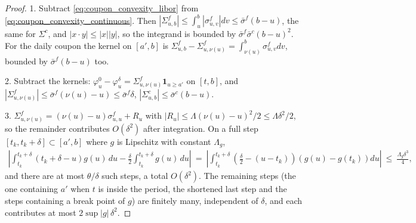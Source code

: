 \documentclass[11pt,english]{amsart}
\newcommand{\vun}{\mathbf{1}}
\theoremstyle{definition}
\begin{document}
\begin{proof}
1. Subtract \eqref{eq:coupon_convexity_libor} from \eqref{eq:coupon_convexity_continuous}. Then $|\Sigma^f_{u,b}|\le\int_u^b|\sigma^f_{u,v}|dv\le\bar{\sigma}^f(b-u)$, the same for $\Sigma^c$, and $|x\cdot y|\le|x||y|$, so the integrand is bounded by $\bar{\sigma}^f\bar{\sigma}^c(b-u)^2$. For the daily coupon the kernel on $[a',b]$ is $\Sigma^f_{u,b}-\Sigma^f_{u,\nu(u)} = \int_{\nu(u)}^b\sigma^f_{u,v}dv$, bounded by $\bar{\sigma}^f(b-u)$ too.

2. Subtract the kernels: $\varphi^0_u-\varphi^\delta_u = \Sigma^f_{u,\nu(u)}\vun_{u\ge a'}$ on $[t,b]$, and $|\Sigma^f_{u,\nu(u)}|\le\bar{\sigma}^f(\nu(u)-u)\le\bar{\sigma}^f\delta$, $|\Sigma^c_{u,b}|\le\bar{\sigma}^c(b-u)$.

3. $\Sigma^f_{u,\nu(u)} = (\nu(u)-u)\sigma^f_{u,u} + R_u$ with $|R_u|\le\Lambda(\nu(u)-u)^2/2\le\Lambda\delta^2/2$, so the remainder contributes $O(\delta^2)$ after integration. On a full step $[t_k,t_k+\delta]\subset[a',b]$ where $g$ is Lipschitz with constant $\Lambda_g$,
\begin{eqnarray*}
  \left|\int_{t_k}^{t_k+\delta}(t_k+\delta-u)g(u)\,du - \frac{\delta}{2}\int_{t_k}^{t_k+\delta}g(u)\,du\right|
  ~=~ \left|\int_{t_k}^{t_k+\delta}\left(\tfrac{\delta}{2}-(u-t_k)\right)\left(g(u)-g(t_k)\right)du\right| ~\le~ \frac{\Lambda_g\delta^3}{4} ,
\end{eqnarray*}
and there are at most $\theta/\delta$ such steps, a total $O(\delta^2)$. The remaining steps (the one containing $a'$ when $t$ is inside the period, the shortened last step and the steps containing a break point of $g$) are finitely many, independent of $\delta$, and each contributes at most $2\sup|g|\,\delta^2$.
\end{proof}
\end{document}
